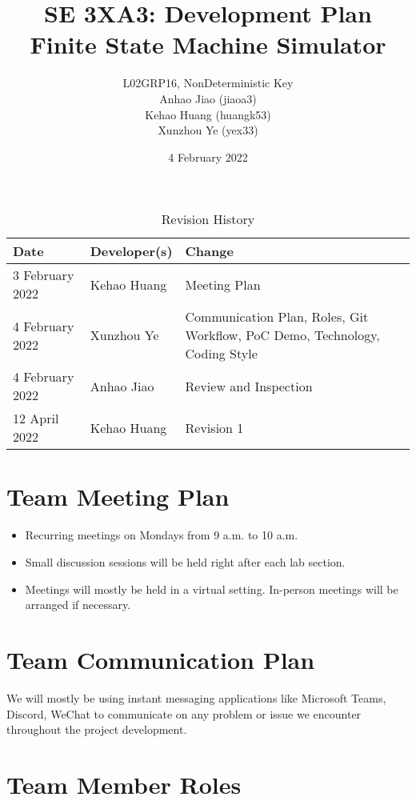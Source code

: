 \documentclass{article}
\title{SE 3XA3: Development Plan\\Finite State Machine Simulator}
\author{L02GRP16, NonDeterministic Key
  \\ Anhao Jiao (jiaoa3)
  \\ Kehao Huang (huangk53)
  \\ Xunzhou Ye (yex33)
}
\date{4 February 2022}
\begin{document}
\begin{table}[hp]
\caption{Revision History} \label{TblRevisionHistory}
\begin{tabularx}{\textwidth}{llX}
\toprule
\textbf{Date} & \textbf{Developer(s)} & \textbf{Change}\\
\midrule
3 February 2022 & Kehao Huang & Meeting Plan \\
4 February 2022 & Xunzhou Ye & Communication Plan, Roles, Git Workflow,
                               PoC Demo, Technology, Coding Style \\
  4 February 2022 & Anhao Jiao & Review and Inspection \\
  12 April 2022 & Kehao Huang & Revision 1\\
\bottomrule
\end{tabularx}
\end{table}

\newpage

\maketitle

\section{Team Meeting Plan}

\begin{itemize}
\item Recurring meetings on Mondays from 9 a.m. to 10 a.m.
\item Small discussion sessions will be held right after each lab section.
\item Meetings will mostly be held in a virtual setting. In-person meetings will
  be arranged if necessary.
\end{itemize}

\section{Team Communication Plan}

We will mostly be using instant messaging applications like Microsoft Teams,
Discord, WeChat to communicate on any problem or issue we encounter throughout
the project development.

\section{Team Member Roles}
\end{document}
